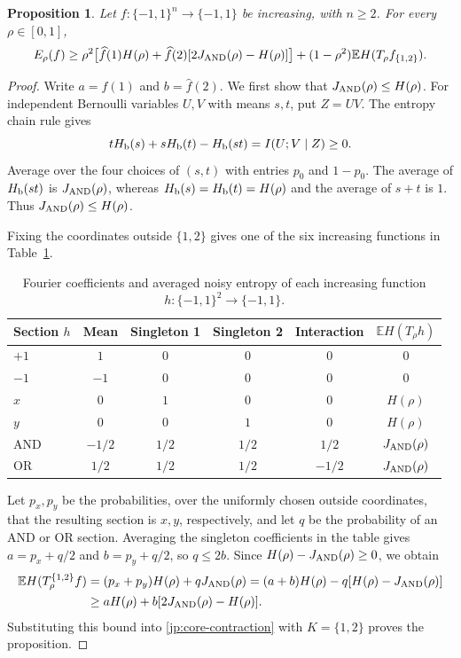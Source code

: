 \documentclass[11pt,letterpaper]{amsart}
\newcommand{\E}{\mathbb E}
\newcommand{\1}{\mathbf 1}
\newtheorem{proposition}[theorem]{Proposition}
\numberwithin{equation}{section}
\begin{document}
\begin{proposition}\label{jp:local2-exact}
Let $f:\{-1,1\}^n\to\{-1,1\}$ be increasing, with $n\ge2$.
For every $\rho\in[0,1]$,
\[
 E_\rho(f)\ge
 \rho^2\bigl[\widehat f(1)H(\rho)
       +\widehat f(2)[2J_{\rm AND}(\rho)-H(\rho)]\bigr]
 +(1-\rho^2)\E H(T_\rho f_{\{1,2\}}).
\]
\end{proposition}
\begin{proof}
Write $a=\widehat f(1)$ and $b=\widehat f(2)$.
We first show that $J_{\rm AND}(\rho)\le H(\rho)$.
For independent Bernoulli variables $U,V$ with means $s,t$,
put $Z=UV$. The entropy chain rule gives
\[
 tH_{\rm b}(s)+sH_{\rm b}(t)-H_{\rm b}(st)
 =I(U;V\mid Z)\ge0.
\]
Average over the four choices of $(s,t)$ with entries
$p_0$ and $1-p_0$.
The average of $H_{\rm b}(st)$ is $J_{\rm AND}(\rho)$,
whereas $H_{\rm b}(s)=H_{\rm b}(t)=H(\rho)$
and the average of $s+t$ is $1$.
Thus $J_{\rm AND}(\rho)\le H(\rho)$.

Fixing the coordinates outside $\{1,2\}$ gives one of the
six increasing functions in Table~\ref{tab:two-coordinate-sections}.
\begin{table}[htbp]\centering\normalsize
\begin{tabular}{@{}lccccc@{}}
\toprule
Section $h$ & Mean & Singleton 1 & Singleton 2 & Interaction
& $\E H(T_\rho h)$\\
\midrule
$+1$ & $1$ & $0$ & $0$ & $0$ & $0$\\
$-1$ & $-1$ & $0$ & $0$ & $0$ & $0$\\
$x$ & $0$ & $1$ & $0$ & $0$ & $H(\rho)$\\
$y$ & $0$ & $0$ & $1$ & $0$ & $H(\rho)$\\
AND & $-1/2$ & $1/2$ & $1/2$ & $1/2$
& $J_{\rm AND}(\rho)$\\
OR & $1/2$ & $1/2$ & $1/2$ & $-1/2$
& $J_{\rm AND}(\rho)$\\
\bottomrule
\end{tabular}
\vspace*{3mm}
\caption{Fourier coefficients and averaged noisy entropy of
each increasing function $h:\{-1,1\}^2\to\{-1,1\}$.}
\label{tab:two-coordinate-sections}
\end{table}

Let $p_x,p_y$ be the probabilities, over the uniformly chosen
outside coordinates, that the resulting section is $x,y$,
respectively, and let $q$ be the probability of an AND or OR section.
Averaging the singleton coefficients in the table gives
$a=p_x+q/2$ and $b=p_y+q/2$, so $q\le2b$.
Since $H(\rho)-J_{\rm AND}(\rho)\ge0$, we obtain
\[
 \begin{aligned}
 \E H(T_\rho^{\{1,2\}}f)
 &=(p_x+p_y)H(\rho)+qJ_{\rm AND}(\rho)=(a+b)H(\rho)-q[H(\rho)-J_{\rm AND}(\rho)]\\
 &\ge aH(\rho)+b[2J_{\rm AND}(\rho)-H(\rho)].
 \end{aligned}
\]
Substituting this bound into \eqref{jp:core-contraction}
with $K=\{1,2\}$ proves the proposition.
\end{proof}
\end{document}
